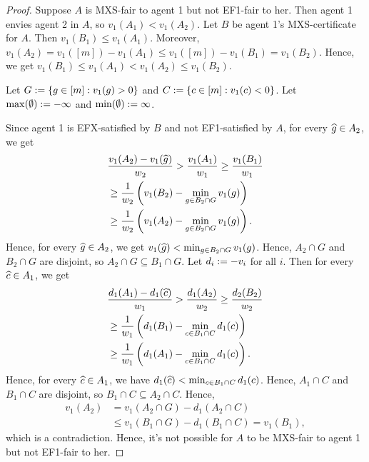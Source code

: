 \begin{proof}
Suppose $A$ is MXS-fair to agent 1 but not EF1-fair to her.
Then agent 1 envies agent 2 in $A$, so $v_1(A_1) < v_1(A_2)$.
Let $B$ be agent 1's MXS-certificate for $A$. Then $v_1(B_1) \le v_1(A_1)$.
Moreover, $v_1(A_2) = v_1([m]) - v_1(A_1) \le v_1([m]) - v_1(B_1) = v_1(B_2)$.
Hence, we get $v_1(B_1) \le v_1(A_1) < v_1(A_2) \le v_1(B_2)$.

Let $G := \{g \in [m]: v_1(g) > 0\}$ and $C := \{c \in [m]: v_1(c) < 0\}$.
Let $\max(\emptyset) := -\infty$ and $\min(\emptyset) := \infty$.

Since agent 1 is EFX-satisfied by $B$ and not EF1-satisfied by $A$,
for every $\widehat{g} \in A_2$, we get
\begin{align*}
& \frac{v_1(A_2) - v_1(\widehat{g})}{w_2} > \frac{v_1(A_1)}{w_1}
\ge \frac{v_1(B_1)}{w_1}
\\ &\ge \frac{1}{w_2}\left(v_1(B_2) - \min_{g \in B_2 \cap G} v_1(g)\right)
\\ &\ge \frac{1}{w_2}\left(v_1(A_2) - \min_{g \in B_2 \cap G} v_1(g)\right).
\end{align*}
Hence, for every $\widehat{g} \in A_2$, we get $v_1(\widehat{g}) < \min_{g \in B_2 \cap G} v_1(g)$.
Hence, $A_2 \cap G$ and $B_2 \cap G$ are disjoint, so $A_2 \cap G \subseteq B_1 \cap G$.
Let $d_i := -v_i$ for all $i$. Then for every $\widehat{c} \in A_1$, we get
\begin{align*}
& \frac{d_1(A_1) - d_1(\widehat{c})}{w_1} > \frac{d_1(A_2)}{w_2}
\ge \frac{d_2(B_2)}{w_2}
\\ &\ge \frac{1}{w_1}\left(d_1(B_1) - \min_{c \in B_1 \cap C} d_1(c)\right)
\\ &\ge \frac{1}{w_1}\left(d_1(A_1) - \min_{c \in B_1 \cap C} d_1(c)\right).
\end{align*}
Hence, for every $\widehat{c} \in A_1$, we have $d_1(\widehat{c}) < \min_{c \in B_1 \cap C} d_1(c)$.
Hence, $A_1 \cap C$ and $B_1 \cap C$ are disjoint, so $B_1 \cap C \subseteq A_2 \cap C$.
Hence,
\begin{align*}
v_1(A_2) &= v_1(A_2 \cap G) - d_1(A_2 \cap C)
\\ &\le v_1(B_1 \cap G) - d_1(B_1 \cap C) = v_1(B_1),
\end{align*}
which is a contradiction.
Hence, it's not possible for $A$ to be MXS-fair to agent 1 but not EF1-fair to her.
\end{proof}

